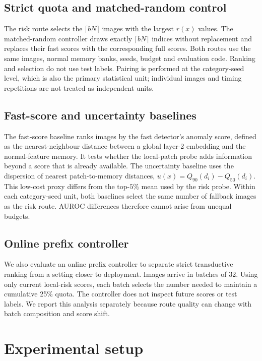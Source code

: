 \documentclass[iicol,pdflatex,sn-basic,Numbered]{sn-jnl}
\begin{document}
\subsection{Strict quota and matched-random control}
The risk route selects the $\lceil bN\rceil$ images with the largest $r(x)$ values. The matched-random controller draws exactly $\lceil bN\rceil$ indices without replacement and replaces their fast scores with the corresponding full scores. Both routes use the same images, normal memory banks, seeds, budget and evaluation code. Ranking and selection do not use test labels. Pairing is performed at the category-seed level, which is also the primary statistical unit; individual images and timing repetitions are not treated as independent units.

\subsection{Fast-score and uncertainty baselines}
The fast-score baseline ranks images by the fast detector's anomaly score, defined as the nearest-neighbour distance between a global layer-2 embedding and the normal-feature memory. It tests whether the local-patch probe adds information beyond a score that is already available. The uncertainty baseline uses the dispersion of nearest patch-to-memory distances, $u(x)=Q_{90}(d_i)-Q_{50}(d_i)$. This low-cost proxy differs from the top-$5\%$ mean used by the risk probe. Within each category-seed unit, both baselines select the same number of fallback images as the risk route. AUROC differences therefore cannot arise from unequal budgets.

\subsection{Online prefix controller}
We also evaluate an online prefix controller to separate strict transductive ranking from a setting closer to deployment. Images arrive in batches of 32. Using only current local-risk scores, each batch selects the number needed to maintain a cumulative 25\% quota. The controller does not inspect future scores or test labels. We report this analysis separately because route quality can change with batch composition and score shift.

\section{Experimental setup}\label{sec:setup}
\end{document}
